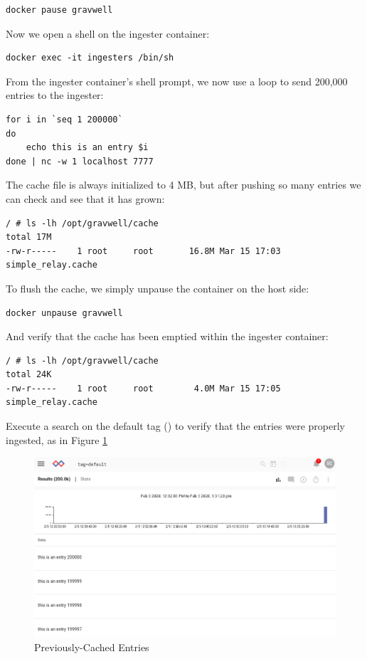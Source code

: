 \begin{Verbatim}[breaklines=true]
docker pause gravwell
\end{Verbatim}

Now we open a shell on the ingester container:

\begin{Verbatim}[breaklines=true]
docker exec -it ingesters /bin/sh
\end{Verbatim}

From the ingester container's shell prompt, we now use a loop to
send 200,000 entries to the ingester:

\begin{Verbatim}[breaklines=true]
for i in `seq 1 200000`
do
	echo this is an entry $i
done | nc -w 1 localhost 7777
\end{Verbatim}

{The cache file is always initialized to 4 MB, but after pushing so many
entries we can check and see that it has grown:}

\begin{Verbatim}[breaklines=true]
/ # ls -lh /opt/gravwell/cache
total 17M    
-rw-r-----    1 root     root       16.8M Mar 15 17:03 simple_relay.cache
\end{Verbatim}

To flush the cache, we simply unpause the container on the host side:

\begin{Verbatim}[breaklines=true]
docker unpause gravwell
\end{Verbatim}

And verify that the cache has been emptied within the ingester
container:

\begin{Verbatim}[breaklines=true]
/ # ls -lh /opt/gravwell/cache
total 24K    
-rw-r-----    1 root     root        4.0M Mar 15 17:05 simple_relay.cache
\end{Verbatim}

Execute a search on the default tag () to verify
that the entries were properly ingested, as in Figure \ref{fig:cache-lab}

\begin{figure}
	\includegraphics{images/igst-cache-lab.png}
	\caption{Previously-Cached Entries}
	\label{fig:cache-lab}
\end{figure}

